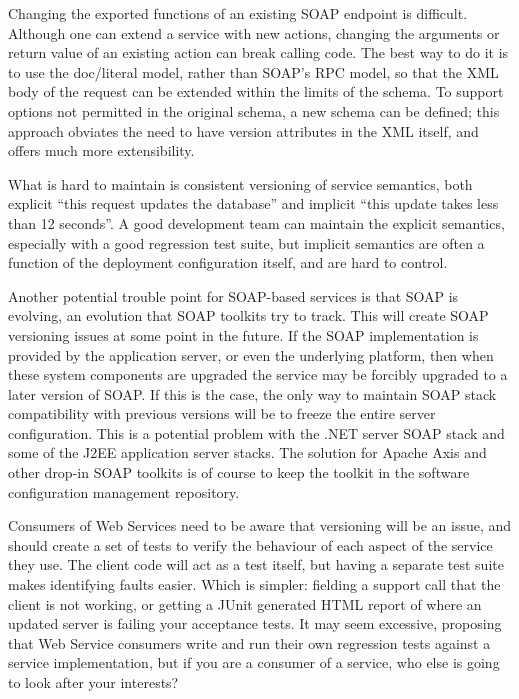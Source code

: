 \documentclass[draft]{report}
\begin{document}
Changing the exported functions of an existing SOAP endpoint is
difficult. Although one can extend a service with new actions, changing
the arguments or return value of an existing action can break calling
code. The best way to do it is to use the doc/literal model, rather than
SOAP's RPC model, so that the XML body of the request can be extended
within the limits of the schema. To support options not permitted in the
original schema, a new schema can be defined; this approach obviates the
need to have version attributes in the XML itself, and offers much more
extensibility.

What is hard to maintain is consistent versioning of service semantics,
both explicit ``this request updates the database'' and implicit ``this
update takes less than 12 seconds''. A good development team can
maintain the explicit semantics, especially with a good regression test
suite, but implicit semantics are often a function of the deployment
configuration itself, and are hard to control.

Another potential trouble point for SOAP-based services is that SOAP is
evolving, an evolution that SOAP toolkits try to track. This will create
SOAP versioning issues at some point in the future. If the SOAP
implementation is provided by the application server, or even the
underlying platform, then when these system components are upgraded the
service may be forcibly upgraded to a later version of SOAP. If this is
the case, the only way to maintain SOAP stack compatibility with
previous versions will be to freeze the entire server configuration.
This is a potential problem with the .NET server SOAP stack and some of
the J2EE application server stacks. The solution for Apache Axis and
other drop-in SOAP toolkits is of course to keep the toolkit in the
software configuration management repository.

Consumers of Web Services need to be aware that versioning will be an
issue, and should create a set of tests to verify the behaviour of each
aspect of the service they use. The client code will act as a test
itself, but having a separate test suite makes identifying faults
easier. Which is simpler: fielding a support call that the client is not
working, or getting a JUnit generated HTML report of where an updated
server is failing your acceptance tests. It may seem excessive,
proposing that Web Service consumers write and run their own regression
tests against a service implementation, but if you are a consumer of a
service, who else is going to look after your interests?
\end{document}
